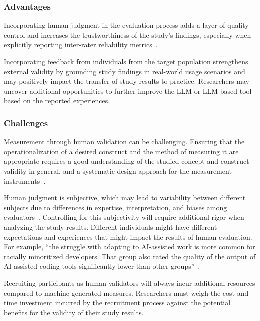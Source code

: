 \subsubsection{Advantages}

Incorporating human judgment in the evaluation process adds a layer of quality control and increases the trustworthiness of the study's findings, especially when explicitly reporting inter-rater reliability metrics~\cite{khraisha2024canlargelanguagemodelshumans}.

Incorporating feedback from individuals from the target population strengthens external validity by grounding study findings in real-world usage scenarios and may positively impact the transfer of study results to practice.
Researchers may uncover additional opportunities to further improve the LLM or LLM-based tool based on the reported experiences.

\subsubsection{Challenges}

Measurement through human validation can be challenging.
Ensuring that the operationalization of a desired construct and the method of measuring it are appropriate requires a good understanding of the studied concept and construct validity in general, and a systematic design approach for the measurement instruments~\cite{DBLP:journals/tse/SjobergB23}.

Human judgment is subjective, which may lead to variability between different subjects due to differences in expertise, interpretation, and biases among evaluators~\cite{DBLP:journals/pacmhci/McDonaldSF19}.
Controlling for this subjectivity will require additional rigor when analyzing the study results.
Different individuals might have different expectations and experiences that might impact the results of human evaluation. For example, \enquote{the struggle with adapting to AI-assisted work is more common for racially minoritized developers. That group also rated the quality of the output of AI-assisted coding tools significantly lower than other groups}~\cite{hicks_lee_foster-marks_2025}.

Recruiting participants as human validators will always incur additional resources compared to machine-generated measures.
Researchers must weigh the cost and time investment incurred by the recruitment process against the potential benefits for the validity of their study results.

